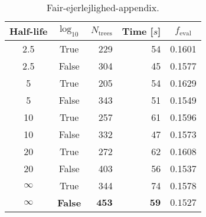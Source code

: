 
\begin{table}[h!]
  \begin{tabular}{@{}ccrrc@{}}
    Half-life & $\log_{10}$ & $N_\mathrm{trees}$ & Time [$s$] & $f_\mathrm{eval}$ \\
    \midrule
    \num{2.5} & True & \num{229} & \num{54} & \num{0.1601} \\
    \num{2.5} & False & \num{304} & \num{45} & \num{0.1577} \\
    \num{5} & True & \num{205} & \num{54} & \num{0.1629} \\
    \num{5} & False & \num{343} & \num{51} & \num{0.1549} \\
    \num{10} & True & \num{257} & \num{61} & \num{0.1596} \\
    \num{10} & False & \num{332} & \num{47} & \num{0.1573} \\
    \num{20} & True & \num{272} & \num{62} & \num{0.1608} \\
    \num{20} & False & \num{403} & \num{56} & \num{0.1537} \\
    $\infty$ & True & \num{344} & \num{74} & \num{0.1578} \\
    $\bm{\infty}$ & \textbf{False} & $\mathbf{453}$ & $\mathbf{59}$ & $\mathbf{0.1527}$ \\
  \end{tabular}
  \caption{\label{tab:h:HPO_initial_Fair-ejerlejlighed-appendix}Fair-ejerlejlighed-appendix.}
\end{table}











